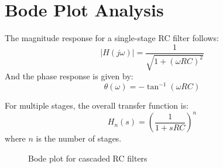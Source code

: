 \documentclass{article}
\begin{document}
\section{Bode Plot Analysis}
The magnitude response for a single-stage RC filter follows:
\begin{equation}
|H(j\omega)| = \frac{1}{\sqrt{1 + (\omega RC)^2}}
\end{equation}
And the phase response is given by:
\begin{equation}
\theta(\omega) = -\tan^{-1}(\omega RC)
\end{equation}

For multiple stages, the overall transfer function is:
\begin{equation}
H_n(s) = \left(\frac{1}{1 + sRC}\right)^n
\end{equation}
where \( n \) is the number of stages.

\begin{figure}[H]
    \centering
    \caption{Bode plot for cascaded RC filters}
\end{figure}
\end{document}
